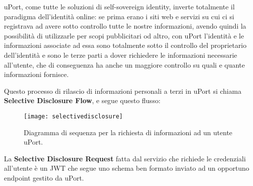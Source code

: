 uPort, come tutte le soluzioni di self-sovereign identity, inverte totalmente
il paradigma dell’identità online:
se prima erano i siti web e servizi su cui ci si registrava ad avere sotto controllo
tutte le nostre informazioni, avendo quindi la possibilità di utilizzarle per scopi pubblicitari od altro,
con uPort l’identità e le informazioni associate ad essa sono totalmente sotto il controllo del
proprietario dell’identità e sono le terze parti a dover richiedere le informazioni necessarie all’utente,
che di conseguenza ha anche un maggiore controllo su quali e quante informazioni fornisce.

Questo processo di rilascio di informazioni personali a terzi
in uPort si chiama \textbf{Selective Disclosure Flow}, e segue questo flusso:

\newpage

\begin{figure}[!ht]
    \texttt{[image: selectivedisclosure]}
    \caption{Diagramma di sequenza per la richiesta di informazioni ad un utente uPort.}
    \label{fig:selectivedisclosure}
\end{figure}

La \textbf{Selective Disclosure Request} fatta dal servizio che richiede le credenziali
all’utente è un JWT che segue uno schema ben formato inviato ad un
opportuno endpoint gestito da uPort. 

